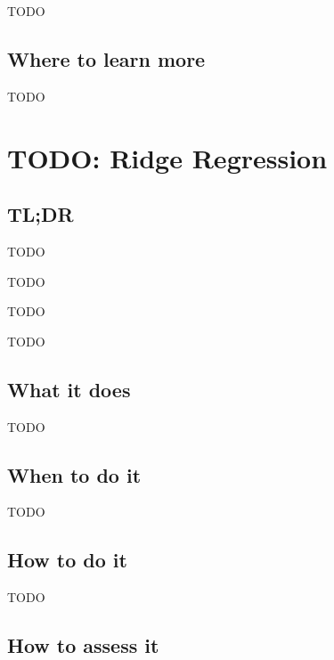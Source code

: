 \documentclass[
]{book}
\providecommand{\tightlist}{%
  \setlength{\itemsep}{0pt}\setlength{\parskip}{0pt}}
\begin{document}
TODO

\hypertarget{where-to-learn-more-12}{%
\section{Where to learn more}\label{where-to-learn-more-12}}

TODO

\hypertarget{ridge-regression}{%
\chapter{TODO: Ridge Regression}\label{ridge-regression}}

\hypertarget{tldr-13}{%
\section{TL;DR}\label{tldr-13}}

\begin{description}
\tightlist
\item[What it does]
TODO
\item[When to do it]
TODO
\item[How to do it]
TODO
\item[How to assess it]
TODO
\end{description}

\hypertarget{what-it-does-13}{%
\section{What it does}\label{what-it-does-13}}

TODO

\hypertarget{when-to-do-it-13}{%
\section{When to do it}\label{when-to-do-it-13}}

TODO

\hypertarget{how-to-do-it-13}{%
\section{How to do it}\label{how-to-do-it-13}}

TODO

\hypertarget{how-to-assess-it-13}{%
\section{How to assess it}\label{how-to-assess-it-13}}
\end{document}
